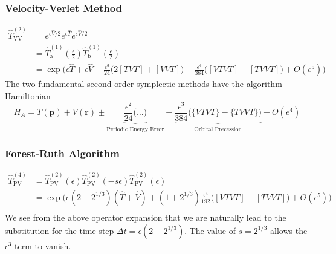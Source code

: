 \documentclass[8pt,a4paper]{article}
\begin{document}
	\subsubsection{Velocity-Verlet Method}
	\begin{align}
		\hat{T}^{(2)}_\mathrm{VV}	&= e^{\epsilon \hat{V}/2}e^{\epsilon \hat{T}} e^{\epsilon \hat{V}/2} \\
		&= \hat{T}^{(1)}_\mathrm{a}\left(\frac{\epsilon}{2}\right) \hat{T}^{(1)}_\mathrm{b}\left(\frac{\epsilon}{2}\right) \\
		&= \exp\Bigg(\epsilon\hat{T} + \epsilon\hat{V} - \frac{\epsilon^3}{24}\Big(2[TVT] + [VVT]\Big) + \frac{\epsilon^4}{384}\Big([VTVT] - [TVVT]\Big) + O(e^5) \Bigg)
	\end{align}
	The two fundamental second order symplectic methods have the algorithm Hamiltonian
	\begin{equation}
		H_A = T(\mathbf{p}) + V(\mathbf{r}) \pm \underbrace{\frac{\epsilon^2}{24}\Big(\ldots\Big)}_{\text{Periodic Energy Error}} + \underbrace{\frac{\epsilon^3}{384}\Big(\{VTVT\} - \{TVVT\}\Big)}_{\text{Orbital Precession}}  + O(e^4)
	\end{equation}
	\subsubsection{Forest-Ruth Algorithm}
	\begin{align}
		\hat{T}^{(4)}_\mathrm{PV} &= \hat{T}^{(2)}_\mathrm{PV}(\epsilon)\hat{T}^{(2)}_\mathrm{PV}(-s\epsilon)\hat{T}^{(2)}_\mathrm{PV}(\epsilon) \\
		&= \exp\Bigg(\epsilon(2-2^{1/3})( \hat{T} + \hat{V}) + (1+2^{1/3})\frac{\epsilon^4}{192}\Big([VTVT] - [TVVT]\Big) + O(\epsilon^5)\Bigg)\\
	\end{align}
	We see from the above operator expansion that we are naturally lead to the substitution for the time step $\Delta t = \epsilon(2-2^{1/3})$. The value of $s=2^{1/3}$ allows the $\epsilon^3$ term to vanish.
	
\end{document}
